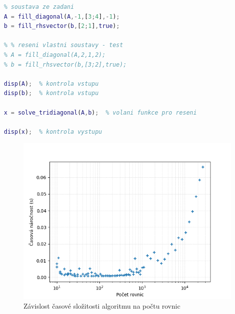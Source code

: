\documentclass[12pt]{CLASS/protokol}
\begin{document}
    \newpage
    \begin{lstlisting}[language=MATLAB,label=ls:use,caption=Příklad uživatelského volání funkcí implementovaných v souboru \matice{llev\_projekt.m}]
%% uzivatelska cast kodu
% soustava ze zadani
A = fill_diagonal(A,-1,[3;4],-1);
b = fill_rhsvector(b,[2;1],true);

% % reseni vlastni soustavy - test
% A = fill_diagonal(A,2,1,2);
% b = fill_rhsvector(b,[3;2],true);

disp(A);  % kontrola vstupu
disp(b);  % kontrola vstupu

x = solve_tridiagonal(A,b);  % volani funkce pro reseni

disp(x);  % kontrola vystupu
    \end{lstlisting}

    \begin{figure}
        \centering
        \includegraphics[width=1\linewidth]{obrazky/casova_narocnost.png}
        \caption{Závislost časové složitosti algoritmu na počtu rovnic}
        \label{fig:slozitost}
    \end{figure}
\end{document}
